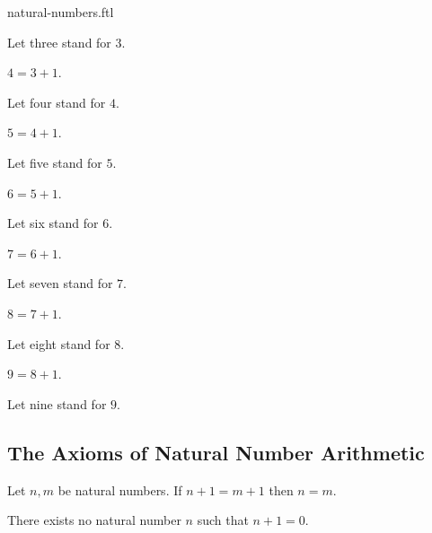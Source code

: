 \documentclass{naproche-library}
\begin{document}
\begin{smodule}{natural-numbers.ftl}
\begin{definition}[forthel,id=ARITHMETIC_01_3836725109456896]
    Let three stand for $3$.
  \end{definition}

  \begin{definition}[forthel,id=ARITHMETIC_01_1709884968009728]
    $4 = 3 + 1$.

    Let four stand for $4$.
  \end{definition}

  \begin{definition}[forthel,id=ARITHMETIC_01_6734726333202432]
    $5 = 4 + 1$.

    Let five stand for $5$.
  \end{definition}

  \begin{definition}[forthel,id=ARITHMETIC_01_949139189792768]
    $6 = 5 + 1$.

    Let six stand for $6$.
  \end{definition}

  \begin{definition}[forthel,id=ARITHMETIC_01_7245471749767168]
    $7 = 6 + 1$.

    Let seven stand for $7$.
  \end{definition}

  \begin{definition}[forthel,id=ARITHMETIC_01_5658172888973312]
    $8 = 7 + 1$.

    Let eight stand for $8$.
  \end{definition}

  \begin{definition}[forthel,id=ARITHMETIC_01_7371844250238976]
    $9 = 8 + 1$.

    Let nine stand for $9$.
  \end{definition}


  \subsection*{The Axioms of Natural Number Arithmetic}

  \begin{axiom}[forthel,id=ARITHMETIC_01_3604163883696128]
    Let $n, m$ be natural numbers.
    If $n + 1 = m + 1$ then $n = m$.
  \end{axiom}

  \begin{axiom}[forthel,id=ARITHMETIC_01_4454289938317312]
    There exists no natural number $n$ such that $n + 1 = 0$.
  \end{axiom}


\end{smodule}
\end{document}
